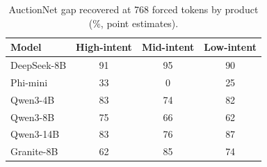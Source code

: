 \begin{table}[h!]
\caption{AuctionNet gap recovered at 768 forced tokens by product (\%, point estimates).}
\label{tab:ancat}
\footnotesize
\centering

\begin{tabular}{lccc}
\toprule
Model & High-intent & Mid-intent & Low-intent \\
\midrule
DeepSeek-8B & 91 & 95 & 90 \\
Phi-mini & 33 & 0 & 25 \\
Qwen3-4B & 83 & 74 & 82 \\
Qwen3-8B & 75 & 66 & 62 \\
Qwen3-14B & 83 & 76 & 87 \\
Granite-8B & 62 & 85 & 74 \\
\bottomrule
\end{tabular}
\end{table}
